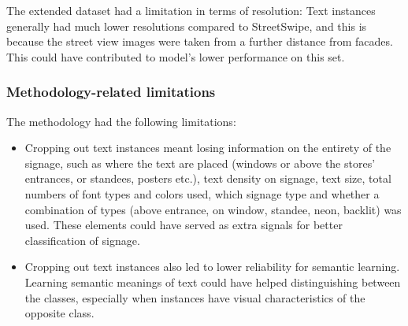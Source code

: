 The extended dataset had a limitation in terms of resolution: Text instances generally had much lower resolutions compared to StreetSwipe, and this is because the street view images were taken from a further distance from facades. This could have contributed to model's lower performance on this set.

\subsubsection{Methodology-related limitations}
The methodology had the following limitations:

\begin{itemize}
    \item Cropping out text instances meant losing information on the entirety of the signage, such as where the text are placed (windows or above the stores' entrances, or standees, posters etc.), text density on signage, text size, total numbers of font types and colors used, which signage type and whether a combination of types (above entrance, on window, standee, neon, backlit) was used. These elements could have served as extra signals for better classification of signage.
    
    \item Cropping out text instances also led to lower reliability for semantic learning. Learning semantic meanings of text could have helped distinguishing between the classes, especially when instances have visual characteristics of the opposite class.

\end{itemize}

